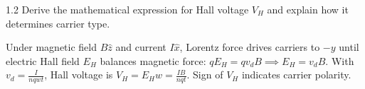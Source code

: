 \vspace{3mm}

\begin{theoryq}{1.2}
Derive the mathematical expression for Hall voltage $V_H$ and explain how it determines carrier type.
\end{theoryq}

\begin{theorysol}
Under magnetic field $B\hat{z}$ and current $I\hat{x}$, Lorentz force drives carriers to $-y$ until electric Hall field $E_H$ balances magnetic force: $q E_H = q v_d B \implies E_H = v_d B$. With $v_d = \frac{I}{nqwt}$, Hall voltage is $V_H = E_H w = \frac{IB}{nqt}$. Sign of $V_H$ indicates carrier polarity.
\end{theorysol}

\vspace{3mm}

